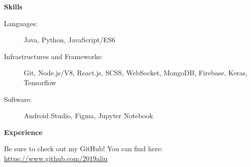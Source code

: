 \documentclass[letterpaper,10pt]{article}
\newcommand{\resheading}[1]{{\large \colorbox{mygrey}{\begin{minipage}{\textwidth}{\textbf{#1 \vphantom{p\^{E}}}}\end{minipage}}}}
\begin{document}
\resheading{Skills}

\begin{description}
\item[Languages:] Java, Python, JavaScript/ES6
\item[Infrastructures and Frameworks:] Git, Node.js/V8, React.js, SCSS, WebSocket, MongoDB, Firebase, Keras, Tensorflow
\item[Software:] Android Studio, Figma, Jupyter Notebook
\end{description}

\resheading{Experience}

\vspace{1em}
Be sure to check out my GitHub! You can find here:  \url{https://www.github.com/2019aliu}
\end{document}
